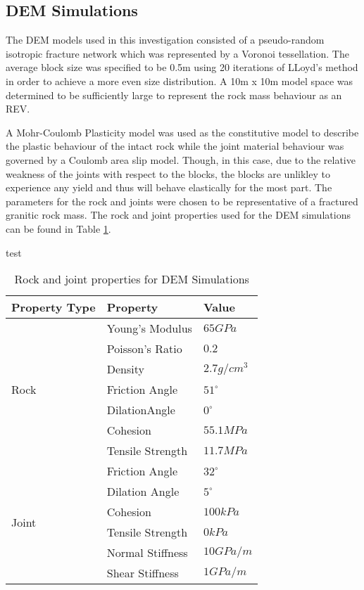 \subsection{DEM Simulations}

The DEM models used in this investigation consisted of a pseudo-random isotropic fracture network which was represented by a Voronoi tessellation. The average block size was specified to be 0.5m using 20 iterations of LLoyd's method \cite{Lloyd_1982} in order to achieve a more even size distribution. A 10m x 10m model space was determined to be sufficiently large to represent the rock mass behaviour as an REV. 

A Mohr-Coulomb Plasticity model was used as the constitutive model to describe the plastic behaviour of the intact rock while the joint material behaviour was governed by a Coulomb area slip model. Though, in this case, due to the relative weakness of the joints with respect to the blocks, the blocks are unlikley to experience any yield and thus will behave elastically for the most part. The parameters for the rock and joints were chosen to be representative of a fractured granitic rock mass. The rock and joint properties used for the DEM simulations can be found in Table \ref{tab:demProp}.

\begin{table}[]
\caption{test}
\label{tab:1}
\end{table}

\begin{table}[]
\centering
\caption{Rock and joint properties for DEM Simulations}
\label{tab:demProp}
\begin{tabular}{@{}lll@{}}
\toprule
Property Type          & Property         & Value        \\ \midrule
\multirow{7}{*}{Rock}  & Young's Modulus  & $65 GPa$     \\
                       & Poisson's Ratio  & $0.2$        \\
                       & Density          & $2.7 g/cm^3$ \\
                       & Friction Angle   & $51^{\circ}$ \\
                       & DilationAngle    & $0^{\circ}$  \\
                       & Cohesion         & $55.1 MPa$   \\
                       & Tensile Strength & $11.7 MPa$   \\ \cmidrule(r){1-1}
\multirow{6}{*}{Joint} & Friction Angle   & $32^{\circ}$ \\
                       & Dilation Angle   & $5^{\circ}$  \\
                       & Cohesion         & $100 kPa$    \\
                       & Tensile Strength & $0 kPa$      \\
                       & Normal Stiffness & $10 GPa/m$   \\
                       & Shear Stiffness  & $1 GPa/m$    \\ \bottomrule
\end{tabular}
\end{table}


